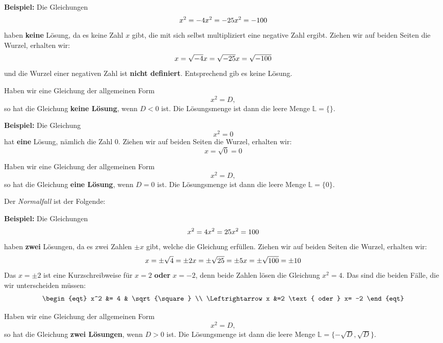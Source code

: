 \begin{example}
	\textbf{Beispiel:} Die Gleichungen 
	\[ x^2 =-4 \\ x^2 =-25 \\ x^2= -100 \]
	haben \textbf{keine} Lösung, da es keine Zahl $x$ gibt, die mit sich selbst multipliziert eine negative Zahl ergibt. Ziehen wir auf beiden Seiten die Wurzel, erhalten wir:
	\[ x =\sqrt{-4} \\ x =\sqrt{-25} \\ x= \sqrt{-100} \]
	und die Wurzel einer negativen Zahl ist \textbf{nicht definiert}. Entsprechend gib es keine Lösung. 
\end{example}
Haben wir eine Gleichung der allgemeinen Form 
\[
x^2 = D,
\]
so hat die Gleichung \textbf{keine Lösung}, wenn $D<0$ ist. Die Lösungsmenge ist dann die leere Menge $\mathbb{L}= \{\}$.
\begin{example}
	\textbf{Beispiel:} Die Gleichung
	\[ x^2 = 0 \]
	hat \textbf{eine} Lösung, nämlich die Zahl 0. Ziehen wir auf beiden Seiten die Wurzel, erhalten wir:
	\[ x =\sqrt{0} = 0 \]
\end{example}
Haben wir eine Gleichung der allgemeinen Form 
\[
x^2 = D,
\]
so hat die Gleichung \textbf{eine Lösung}, wenn $D=0$ ist. Die Lösungsmenge ist dann die leere Menge $\mathbb{L}= \{0\}$.

Der \textit{Normalfall} ist der Folgende:
\begin{example}
	\textbf{Beispiel:} Die Gleichungen 
	\[ x^2 =4 \\ x^2 =25 \\ x^2= 100 \]
	haben \textbf{zwei} Lösungen, da es zwei Zahlen $\pm x$ gibt, welche die Gleichung erfüllen. Ziehen wir auf beiden Seiten die Wurzel, erhalten wir:
	\[ x =\pm \sqrt{4} = \pm 2 \\ x = \pm \sqrt{25} = \pm 5\\ x= \pm  \sqrt{100} = \pm 10 \]
	Das $x= \pm 2$ ist eine Kurzschreibweise für $x=2$ \textbf{oder} $x=-2$, denn beide Zahlen lösen die Gleichung $x^2=4$. Das sind die beiden Fälle, die wir unterscheiden müssen:
	  \[\begin{eqt}
		x^2 &= 4  & \sqrt{\square} \\
		\Leftrightarrow x &=2 \text{ oder }  x= -2  
	\end{eqt}\]
	
\end{example}
Haben wir eine Gleichung der allgemeinen Form 
\[
x^2 = D,
\]
so hat die Gleichung \textbf{zwei Lösungen}, wenn $D>0$ ist. Die Lösungsmenge ist dann die leere Menge $\mathbb{L}= \{-\sqrt{D},\sqrt{D}\}$.

